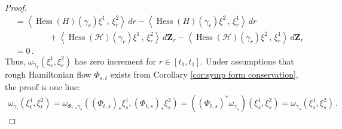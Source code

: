 \documentclass[11pt, oneside]{article}
\numberwithin{equation}{section}
\theoremstyle{definition}
\newcommand{\wt}[1]{\widetilde{#1}}
\newcommand{\mc}[1]{\mathcal{#1}}
\newcommand{\mcal}[1]{\mc{#1}}
\newcommand{\scp}[2]{{\left\langle {#1}\, , \, {#2}\right\rangle}}
\begin{document}
\begin{proof}
\begin{align*}
        &= \scp{\operatorname{Hess}(H)(\gamma_r)\xi^1}{\xi^2_r}\,dr - \scp{\operatorname{Hess}(H)(\gamma_r)\xi^2}{\xi^1_r}\,dr \\
        & \qquad \qquad + \scp{\operatorname{Hess}(\mcal{H})(\gamma_r)\xi^1}{\xi^2_r}\,d\mathbf{Z}_r - \scp{\operatorname{Hess}(\mcal{H})(\gamma_r)\xi^2}{\xi^1_r}\,d\mathbf{Z}_r \\
        & = 0\,.
    \end{align*}
    Thus, $\omega_{\gamma_r}(\xi^1_r, \xi^2_r)$ has zero increment for $r \in [t_0, t_1]$. Under assumptions that rough Hamiltonian flow $\Phi_{s, t}$ exists from Corollary \ref{cor:symp form conservation}, the proof is one line:
    \begin{align*}
        \omega_{\gamma_t}(\xi^1_t, \xi^2_t) = \omega_{\Phi_{t,s}\gamma_s}(\left(\Phi_{t,s}\right)_*\xi^1_s, \left(\Phi_{t,s}\right)_*\xi^2_s) = (\left(\Phi_{t,s}\right)^*\omega_{\gamma_s}) (\xi^1_s, \xi^2_s) = \omega_{\gamma_s}(\xi^1_s, \xi^2_s)\,.
    \end{align*}
\end{proof}

\end{document}
